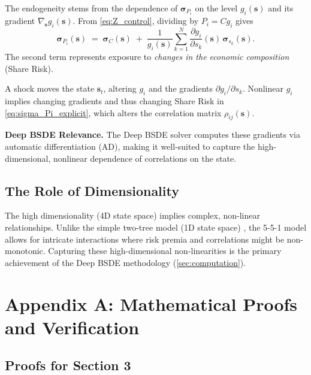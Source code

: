 \documentclass[11pt,letterpaper,oneside]{article}
\numberwithin{equation}{section}
\newcommand{\1}{\mathbf{1}}
\begin{document}
\begin{tcolorbox}[mathstyle,title={Mechanism of Endogeneity: The Role of Gradients}]
  The endogeneity stems from the dependence of $\bm{\sigma}_{P_i}$ on the level $g_i(\bm{s})$ and its gradient $\nabla_{\bm{s}} g_i(\bm{s})$. From \cref{eq:Z_control}, dividing by $P_i=C g_i$ gives
  \begin{equation}\label{eq:sigma_Pi_explicit}
    \bm{\sigma}_{P_i}(\bm{s}) \;=\; \bm{\sigma}_C(\bm{s}) \; + \; \frac{1}{g_i(\bm{s})} \sum_{k=1}^N \frac{\partial g_i}{\partial s_k}(\bm{s})\,\bm{\sigma}_{s_k}(\bm{s}).
  \end{equation}
  The second term represents exposure to \emph{changes in the economic composition} (Share Risk).
\end{tcolorbox}

\begin{tcolorbox}[didacticstyle,title={Intuition and Computational Link}]
  A shock moves the state $\bm{s}_t$, altering $g_i$ and the gradients $\partial g_i/\partial s_k$. Nonlinear $g_i$ implies changing gradients and thus changing Share Risk in \cref{eq:sigma_Pi_explicit}, which alters the correlation matrix $\rho_{ij}(\bm{s})$.

  	\textbf{Deep BSDE Relevance.} The Deep BSDE solver computes these gradients via automatic differentiation (AD), making it well-suited to capture the high-dimensional, nonlinear dependence of correlations on the state.
\end{tcolorbox}

\subsection{The Role of Dimensionality}
The high dimensionality (4D state space) implies complex, non-linear relationships. Unlike the simple two-tree model (1D state space) \cite{cochrane2008}, the 5-5-1 model allows for intricate interactions where risk premia and correlations might be non-monotonic. Capturing these high-dimensional non-linearities is the primary achievement of the Deep BSDE methodology (\cref{sec:computation}).

\appendix

\section{Appendix A: Mathematical Proofs and Verification}\label{app:proofs}

\subsection{Proofs for Section 3}
\end{document}
